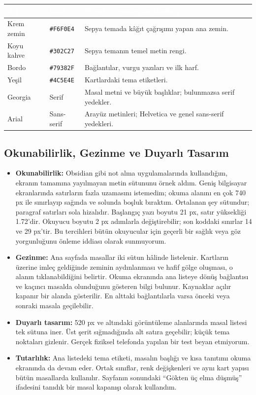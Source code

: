 \documentclass[12pt,a4paper]{article}
\begin{document}
\begin{center}
\begin{tabular}{@{}llp{6.4cm}@{}}
\toprule
\rowcolor{ana}\textcolor{white}{\textbf{Ad}} & \textcolor{white}{\textbf{Kod}} & \textcolor{white}{\textbf{Nerede / neden kullandınız?}} \\
\midrule
Krem zemin & \texttt{\#F6F0E4} & Sepya temada kâğıt çağrışımı yapan ana zemin. \\
Koyu kahve & \texttt{\#302C27} & Sepya temanın temel metin rengi. \\
Bordo & \texttt{\#79382F} & Bağlantılar, vurgu yazıları ve ilk harf. \\
Yeşil & \texttt{\#4C5E4E} & Kartlardaki tema etiketleri. \\
Georgia & Serif & Masal metni ve büyük başlıklar; bulunmazsa serif yedekler. \\
Arial & Sans-serif & Arayüz metinleri; Helvetica ve genel sans-serif yedekleri. \\
\bottomrule
\end{tabular}
\end{center}

\subsection{Okunabilirlik, Gezinme ve Duyarlı Tasarım}
\begin{itemize}
  \item \textbf{Okunabilirlik:} Obsidian gibi not alma uygulamalarında kullandığım, ekranın tamamına yayılmayan metin sütununu örnek aldım. Geniş bilgisayar ekranlarında satırların fazla uzamasını istemedim; okuma alanını en çok 740 px ile sınırlayıp sağında ve solunda boşluk bıraktım. Ortalanan şey sütundur; paragraf satırları sola hizalıdır. Başlangıç yazı boyutu 21 px, satır yüksekliği 1.72'dir. Okuyucu boyutu 2 px adımlarla değiştirebilir; son koddaki sınırlar 14 ve 29 px'tir. Bu tercihleri bütün okuyucular için geçerli bir sağlık veya göz yorgunluğunu önleme iddiası olarak sunmuyorum.
  \item \textbf{Gezinme:} Ana sayfada masallar iki sütun hâlinde listelenir. Kartların üzerine imleç geldiğinde zeminin aydınlanması ve hafif gölge oluşması, o alanın tıklanabildiğini belirtir. Okuma ekranında ana listeye dönüş bağlantısı ve kaçıncı masalda olunduğunu gösteren bilgi bulunur. Kaynaklar açılır kapanır bir alanda gösterilir. En alttaki bağlantılarla varsa önceki veya sonraki masala geçilebilir.
  \item \textbf{Duyarlı tasarım:} 520 px ve altındaki görüntüleme alanlarında masal listesi tek sütuna iner. Üst şerit sığmadığında alt satıra geçebilir; küçük tema noktaları gizlenir. Gerçek fiziksel telefonda yapılan bir test beyan etmiyorum.
  \item \textbf{Tutarlılık:} Ana listedeki tema etiketi, masalın başlığı ve kısa tanıtımı okuma ekranında da devam eder. Ortak sınıflar, renk değişkenleri ve aynı kart yapısı bütün masallarda kullanılır. Sayfanın sonundaki ``Gökten üç elma düşmüş'' ifadesini tanıdık bir masal kapanışı olarak kullandım.
\end{itemize}
\end{document}
